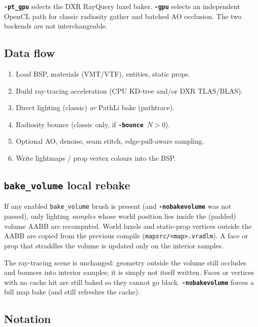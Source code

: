 \documentclass[11pt,a4paper]{article}
\newcommand{\flag}[1]{\texttt{\bfseries #1}}
\newcommand{\ent}[1]{\texttt{#1}}
\begin{document}
\begin{notebox}
  \flag{-pt\_gpu} selects the DXR RayQuery luxel baker.
  \flag{-gpu} selects an independent OpenCL path for classic radiosity gather
  and batched AO occlusion. The two backends are not interchangeable.
\end{notebox}

\subsection{Data flow}

\begin{enumerate}[leftmargin=1.6em]
  \item Load BSP, materials (VMT/VTF), entities, static props.
  \item Build ray-tracing acceleration (CPU KD-tree and/or DXR TLAS/BLAS).
  \item Direct lighting (classic) \emph{or} PathLi bake (pathtrace).
  \item Radiosity bounce (classic only, if \flag{-bounce}~$N>0$).
  \item Optional AO, denoise, seam stitch, edge-pull-aware sampling.
  \item Write lightmaps / prop vertex colours into the BSP.
\end{enumerate}

\subsection{\texttt{bake\_volume} local rebake}

If any enabled \ent{bake\_volume} brush is present (and \flag{-nobakevolume}
was not passed), only lighting \emph{samples} whose world position lies inside
the (padded) volume AABB are recomputed. World luxels and static-prop vertices
outside the AABB are copied from the previous compile
(\texttt{mapsrc/<map>.vradlm}). A face or prop that straddles the volume is
updated only on the interior samples.

The ray-tracing scene is unchanged: geometry outside the volume still occludes
and bounces into interior samples; it is simply not itself written. Faces or
vertices with no cache hit are still baked so they cannot go black.
\flag{-nobakevolume} forces a full map bake (and still refreshes the cache).

\subsection{Notation}
\end{document}
